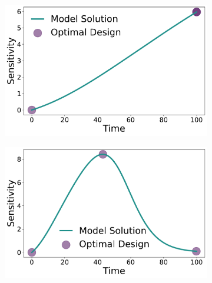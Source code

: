 \documentclass[graybox]{svmult}
\begin{document}
\begin{figure}[H]
\begin{subfigure}{.5\textwidth}
    \end{subfigure}
    \begin{subfigure}{.5\textwidth}
      \centering
      \includegraphics[scale=0.255]{Figures/Sensitivity_Results_baranyi_roberts_ode_fisher_determinant_rel_sensit_cont_2times_2temps_000_x_00_p_01.pdf}
    \end{subfigure}
    \begin{subfigure}{.5\textwidth}
        \centering
        \includegraphics[scale=0.255]{Figures/Sensitivity_Results_baranyi_roberts_ode_fisher_determinant_rel_sensit_cont_2times_2temps_001_x_00_p_01.pdf}
    \end{subfigure}
    \begin{subfigure}{.5\textwidth}
        \centering

\end{subfigure}
\end{figure}
\end{document}
